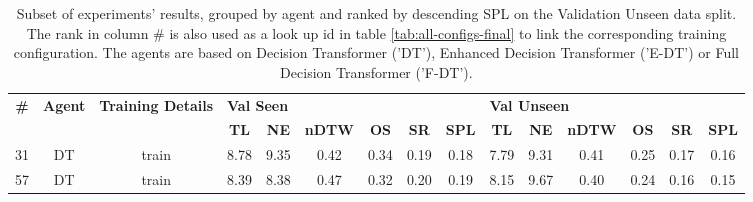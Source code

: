 \begin{table}
\centering
\caption{\label{tab:inflection_weights}Subset of experiments' results, grouped by agent and ranked by descending SPL on the Validation Unseen data split. The rank in column \# is also used as a look up id in table \ref{tab:all-configs-final} to link the corresponding training configuration.     \newline The agents are based on Decision Transformer ('DT'), Enhanced Decision Transformer ('E-DT') or Full Decision Transformer ('F-DT').}
\begin{tabular}{@{\hskip3pt}c@{\hskip3pt}c@{\hskip3pt}c@{\hskip3pt}c@{\hskip3pt}c@{\hskip3pt}c@{\hskip3pt}c@{\hskip3pt}c@{\hskip3pt}c@{\hskip3pt}c@{\hskip3pt}c@{\hskip3pt}c@{\hskip3pt}c@{\hskip3pt}c@{\hskip3pt}c}
\toprule
\textbf{\#} & \textbf{Agent} & \textbf{Training Details} & \multicolumn{6}{l}{\textbf{Val Seen}} & \multicolumn{6}{l}{\textbf{Val Unseen}} \\
 \textbf{~} &     \textbf{~} &                \textbf{~} &       \textbf{TL} & \textbf{NE} & \textbf{nDTW} & \textbf{OS} & \textbf{SR} & \textbf{SPL} &         \textbf{TL} & \textbf{NE} & \textbf{nDTW} & \textbf{OS} & \textbf{SR} & \textbf{SPL} \\
\midrule
         31 &             DT &                     train &              8.78 &        9.35 &          0.42 &        0.34 &        0.19 &         0.18 &                7.79 &        9.31 &          0.41 &        0.25 &        0.17 &         0.16 \\
         57 &             DT &                     train &              8.39 &        8.38 &          0.47 &        0.32 &        0.20 &         0.19 &                8.15 &        9.67 &          0.40 &        0.24 &        0.16 &         0.15 \\
\bottomrule
\end{tabular}
\end{table}
